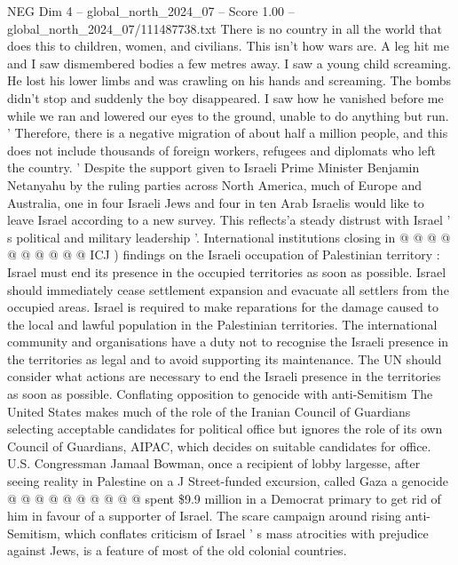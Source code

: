 \begin{textsample}{NEG Dim 4 – global\_north\_2024\_07 – Score 1.00 – global\_north\_2024\_07/111487738.txt}  \label{ex:f4_neg_269}
There is no country in all the world that does this to children, women, and civilians.
This isn't how wars are.
A leg hit me and I saw dismembered bodies a few metres away.
I saw a young child screaming.
He lost his lower limbs and was crawling on his hands and screaming.
The bombs didn't stop and suddenly the boy disappeared.
I saw how he vanished before me while we ran and lowered our eyes to the ground, unable to do anything but run. ' Therefore, there is a negative migration of about half a million people, and this does not include thousands of foreign workers, refugees and diplomats who left the country. ' Despite the support given to Israeli Prime Minister Benjamin Netanyahu by the ruling parties across North America, much of Europe and Australia, one in four Israeli Jews and four in ten Arab Israelis would like to leave Israel according to a new survey.
This reflects'a steady distrust with Israel ' s political and military leadership '.
International institutions closing in @ @ @ @ @ @ @ @ @ @ ICJ ) findings on the Israeli occupation of Palestinian territory : Israel must end its presence in the occupied territories as soon as possible.
Israel should immediately cease settlement expansion and evacuate all settlers from the occupied areas.
Israel is required to make reparations for the damage caused to the local and lawful population in the Palestinian territories.
The international community and organisations have a duty not to recognise the Israeli presence in the territories as legal and to avoid supporting its maintenance.
The UN should consider what actions are necessary to end the Israeli presence in the territories as soon as possible.
Conflating opposition to genocide with anti-Semitism The United States makes much of the role of the Iranian Council of Guardians selecting acceptable candidates for political office but ignores the role of its own Council of Guardians, AIPAC, which decides on suitable candidates for office.
U.S.
Congressman Jamaal Bowman, once a recipient of lobby largesse, after seeing reality in Palestine on a J Street-funded excursion, called Gaza a genocide @ @ @ @ @ @ @ @ @ @ spent \$9.9 million in a Democrat primary to get rid of him in favour of a supporter of Israel.
The scare campaign around rising anti-Semitism, which conflates criticism of Israel ' s mass atrocities with prejudice against Jews, is a feature of most of the old colonial countries.

\end{textsample}
